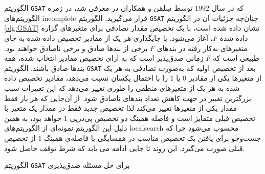  الگوریتم 
\texttt{GSAT}
که در سال 
$1992$
توسط  سِلمَن و همکاران در 
\cite{selman1992new}
معرفی شد، 
در زمره الگوریتم‌های 
\gls*{incomplete}
قرار می‌گیرید.  الگوریتم 
\texttt{GSAT}
چنان‌چه  جزئیات آن در  الگوریتم 
\ref{alg:GSAT}
نشان داده شده است، با یک تخصیص مقدار تصادفی برای متغیرهای  گزاره داده شده  
$F$،
آغاز می‌شود.   با جایگذاری  هر یک از مقادیر تخصیص داده شده به جای متغیرهای به‌کار رفته در بندهای 
$F$
برخی از بندها صادق  و برخی ناصادق خواهند بود. طبیعی است که 
$F$
زمانی صدق‌پذیر است که به ازای تخصیص  مقادیر انتخاب شده، همه بندها صادق باشند.  الگوریتم 
\texttt{GSAT}
بعد از تخصیص اولیه که به‌صورت تصادفی به هر یک از متغیرها یکی از مقادیر 
$0$
یا 
$1$
را با احتمال یکسان نسبت می‌دهد،  مقادیر تخصیص داده شده به هر یک از متغیرهای منطقی را طوری تغییر می‌دهد که این تغییرات  سبب    بزرگترین  تغییر در جهت کاهش تعداد بندهای ناصادق شود.   از آن‌جایی که هر بار فقط مقدار یکی از متغیرها تغییر می‌کند لذا تخصیص جدید فقط در مقدار یک متغیر با تخصیص قبلی متمایز است و فاصله همینگ دو تخصیص پی‌درپی 
$1$
خواهد بود، به همین دلیل این الگوریتم نمونه‌ای از الگوریتم‌های 
\gls*{localsearch}
محسوب می‌شود چرا که جست‌وجو برای  یافتن یک تخصیص مناسب در همسایگی با فاصله‌ی همینگ 
$1$
از تخصیص قبلی صورت می‌گیرد.   این روند تا جایی ادامه می یابد که شرط توقف حاصل شود. 
\begin{algorithm}
	\renewcommand{\algorithmicrequire}{\textbf{Input:}}
	\renewcommand{\algorithmicensure}{\textbf{Output:}}
	\caption{الگوریتم  
		\texttt{GSAT}
		برای حل مسئله صدق‌پذیری}
	\label{alg:GSAT}
	\begin{latin}
		\begin{algorithmic}[1]
		    \RETURN{$\sigma$} 
		    \ENDIF		    
		    \ENDFOR
		    \ENDFOR
		\end{algorithmic}
	\end{latin}
\end{algorithm}
